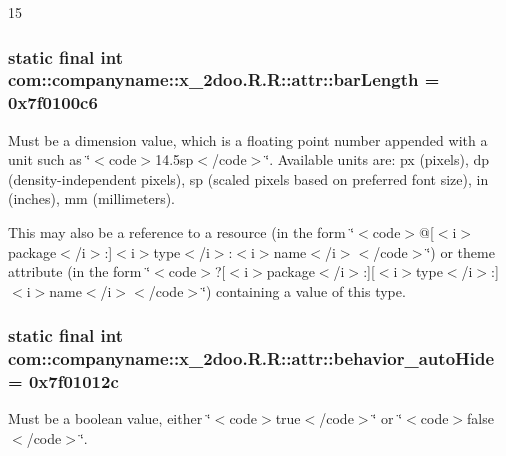 15\hypertarget{classcom_1_1companyname_1_1x__2doo_1_1_r_1_1attr_6c62900ec8d117b9e103e454ed07d741}{
\subsubsection[{barLength}]{\setlength{\rightskip}{0pt plus 5cm}static final int com::companyname::x\_\-2doo.R.R::attr::barLength = 0x7f0100c6}}
\label{classcom_1_1companyname_1_1x__2doo_1_1_r_1_1attr_6c62900ec8d117b9e103e454ed07d741}


Must be a dimension value, which is a floating point number appended with a unit such as \char`\"{}$<$code$>$14.5sp$<$/code$>$\char`\"{}. Available units are: px (pixels), dp (density-independent pixels), sp (scaled pixels based on preferred font size), in (inches), mm (millimeters). 

This may also be a reference to a resource (in the form \char`\"{}$<$code$>$@\mbox{[}$<$i$>$package$<$/i$>$:\mbox{]}$<$i$>$type$<$/i$>$:$<$i$>$name$<$/i$>$$<$/code$>$\char`\"{}) or theme attribute (in the form \char`\"{}$<$code$>$?\mbox{[}$<$i$>$package$<$/i$>$:\mbox{]}\mbox{[}$<$i$>$type$<$/i$>$:\mbox{]}$<$i$>$name$<$/i$>$$<$/code$>$\char`\"{}) containing a value of this type. \hypertarget{classcom_1_1companyname_1_1x__2doo_1_1_r_1_1attr_edb4a73e35e4021aa727f197082f8de3}{
\subsubsection[{behavior\_\-autoHide}]{\setlength{\rightskip}{0pt plus 5cm}static final int com::companyname::x\_\-2doo.R.R::attr::behavior\_\-autoHide = 0x7f01012c}}
\label{classcom_1_1companyname_1_1x__2doo_1_1_r_1_1attr_edb4a73e35e4021aa727f197082f8de3}


Must be a boolean value, either \char`\"{}$<$code$>$true$<$/code$>$\char`\"{} or \char`\"{}$<$code$>$false$<$/code$>$\char`\"{}. 

